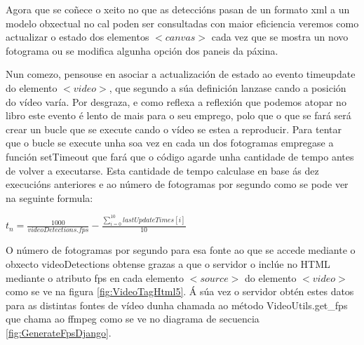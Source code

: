        Agora que se coñece o xeito no que as deteccións pasan de un formato xml a un modelo obxectual 
        no cal poden ser consultadas con maior eficiencia veremos como actualizar o estado dos elementos
        $<canvas>$ cada vez que se mostra un novo fotograma ou se modifica algunha opción dos paneis da
        páxina.
        
        Nun comezo, pensouse en asociar a actualización de estado ao evento timeupdate do elemento 
        $<video>$, que segundo a súa definición lanzase cando a posición do vídeo varía. Por desgraza, 
        e como reflexa a reflexión que podemos atopar no libro \cite[Capítulo 6.1]{video-con-html5}
        este evento é lento de mais para o seu emprego, polo que o que se fará será
        crear un bucle que se execute cando o vídeo se estea a reproducir. Para tentar que o bucle se 
        execute unha soa vez en cada un dos fotogramas empregase a función setTimeout que fará que o 
        código agarde unha cantidade de tempo antes de volver a executarse. Esta cantidade de tempo 
        calculase en base ás dez execucións anteriores e ao número de fotogramas por segundo como se
        pode ver na seguinte formula:
        
        \vspace{1cm}
        \begingroup\makeatletter{}\check@mathfonts
            $ t_n = \frac{1000}{videoDetections.fps} - \frac{\sum_{i=0}^{10} lastUpdateTimes[i]}{10}$
        \endgroup
        \vspace{1cm}
        
        O número de fotogramas por segundo para esa fonte ao que se accede mediante o obxecto 
        videoDetections obtense grazas a que o servidor o inclúe no HTML mediante o atributo fps en 
        cada elemento $<source>$ do elemento $<video>$ como se ve na figura \ref{fig:VideoTagHtml5}.
        Á súa vez o servidor obtén estes datos para as distintas fontes de vídeo dunha chamada ao
        método VideoUtils.get\_fps que chama ao ffmpeg como se ve no diagrama de secuencia 
        \ref{fig:GenerateFpsDjango}.
        
